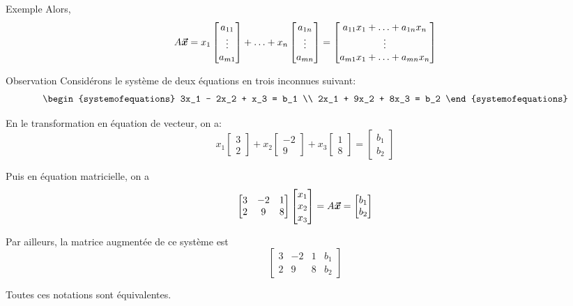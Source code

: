 \documentclass{article}
\begin{document}
\begin{parag}{Exemple}
    Alors,
    \[A \bm{\protect\vec{x}} = x_1 \begin{bmatrix} a_{11} \\ \vdots \\ a_{m1} \end{bmatrix} + \ldots + x_n \begin{bmatrix} a_{1n} \\ \vdots \\ a_{mn} \end{bmatrix}  = \begin{bmatrix} a_{11} x_1 + \ldots + a_{1n} x_n \\ \vdots \\ a_{m1} x_1 + \ldots + a_{mn} x_n \end{bmatrix} \]

\end{parag}

\begin{parag}{Observation}
    Considérons le système de deux équations en trois inconnues suivant:
    \[\begin{systemofequations}
    3x_1 - 2x_2 + x_3 = b_1 \\
    2x_1 + 9x_2 + 8x_3 = b_2
    \end{systemofequations}\]

    En le transformation en équation de vecteur, on a:
    \[x_1 \begin{bmatrix} 3 \\ 2 \end{bmatrix} + x_2 \begin{bmatrix} -2 \\ 9 \end{bmatrix} + x_3 \begin{bmatrix} 1 \\ 8 \end{bmatrix} = \begin{bmatrix} b_1 \\ b_2 \end{bmatrix} \]

    Puis en équation matricielle, on a
    \[\begin{bmatrix} 3 & -2 & 1 \\ 2 & 9 & 8 \end{bmatrix} \begin{bmatrix} x_1 \\ x_2 \\ x_3 \end{bmatrix} = A \bm{\protect\vec{x}} = \begin{bmatrix} b_1 \\ b_2 \end{bmatrix} \]

    Par ailleurs, la matrice augmentée de ce système est
    \[\begin{bmatrix} 3 & -2 & 1 & b_1 \\ 2 & 9 & 8 & b_2 \end{bmatrix}  \]

    Toutes ces notations sont équivalentes.
\end{parag}
\end{document}
